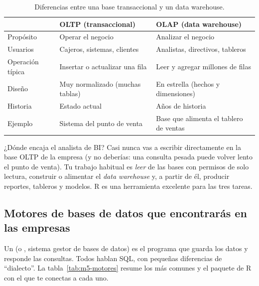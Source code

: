 \begin{table}[H]
\centering
\small
\caption{Diferencias entre una base transaccional y un data warehouse.}
\label{tab:m5-oltp-olap}
\begin{tabularx}{\textwidth}{@{}lXX@{}}
\toprule
 & \textbf{OLTP (transaccional)} & \textbf{OLAP (data warehouse)} \\
\midrule
Propósito & Operar el negocio & Analizar el negocio \\
Usuarios & Cajeros, sistemas, clientes & Analistas, directivos, tableros \\
Operación típica & Insertar o actualizar una fila & Leer y agregar millones de filas \\
Diseño & Muy normalizado (muchas tablas) & En estrella (hechos y dimensiones) \\
Historia & Estado actual & Años de historia \\
Ejemplo & Sistema del punto de venta & Base que alimenta el tablero de ventas \\
\bottomrule
\end{tabularx}
\end{table}

\begin{negocio}{¿Dónde encaja el analista de BI?}
Casi nunca vas a escribir directamente en la base OLTP de la empresa (y no
deberías: una consulta pesada puede volver lento el punto de venta). Tu
trabajo habitual es \emph{leer} de las bases con permisos de solo lectura,
construir o alimentar el \emph{data warehouse} y, a partir de él, producir
reportes, tableros y modelos. R es una herramienta excelente para las tres
tareas.
\end{negocio}

\subsection{Motores de bases de datos que encontrarás en las empresas}

Un  (o , sistema gestor de
bases de datos) es el programa que guarda los datos y responde las
consultas. Todos hablan SQL, con pequeñas diferencias de ``dialecto''. La
tabla~\ref{tab:m5-motores} resume los más comunes y el paquete de R con el
que te conectas a cada uno.

